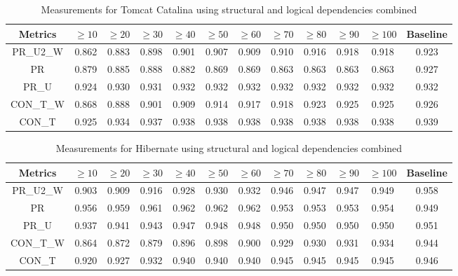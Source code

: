 \documentclass[runningheads]{comsis2}
\begin{document}
\begin{table}[!h]
\setlength\tabcolsep{3.5pt}
\caption{Measurements for Tomcat Catalina using structural and logical dependencies combined}
\label{tab:measurementscombined:tomcat}
\centering
\begin{tabular}{|c|cccccccccc|c|}
\hline
Metrics &	$\geq10$	&	$\geq20$		&	$\geq30$		&	$\geq40$		&	$\geq50$		&	$\geq60$		&	$\geq70$		&	$\geq80$		&	$\geq90$		&	$\geq100$		&	Baseline \\
\hline

PR\_U2\_W	&	0.862	&	0.883	&	0.898	&	0.901	&	0.907	&	0.909	&	0.910	&	0.916	&	0.918	&	0.918	&	0.923	\\
PR	&	0.879	&	0.885	&	0.888	&	0.882	&	0.869	&	0.869	&	0.863	&	0.863	&	0.863	&	0.863	&	0.927	\\
PR\_U	&	0.924	&	0.930	&	0.931	&	0.932	&	0.932	&	0.932	&	0.932	&	0.932	&	0.932	&	0.932	&	0.932	\\
CON\_T\_W	&	0.868	&	0.888	&	0.901	&	0.909	&	0.914	&	0.917	&	0.918	&	0.923	&	0.925	&	0.925	&	0.926	\\
CON\_T	&	0.925	&	0.934	&	0.937	&	0.938	&	0.938	&	0.938	&	0.938	&	0.938	&	0.938	&	0.938	&	0.939	\\
																										

\hline
\end{tabular}
\end{table}


\begin{table}[!h]
\setlength\tabcolsep{3.5pt}
\caption{Measurements for Hibernate using structural and logical dependencies combined}
\label{tab:measurementscombined:hibernate}
\centering
\begin{tabular}{|c|cccccccccc|c|}
\hline
Metrics &	$\geq10$	&	$\geq20$		&	$\geq30$		&	$\geq40$		&	$\geq50$		&	$\geq60$		&	$\geq70$		&	$\geq80$		&	$\geq90$		&	$\geq100$		&	Baseline \\
\hline

PR\_U2\_W	&	0.903	&	0.909	&	0.916	&	0.928	&	0.930	&	0.932	&	0.946	&	0.947	&	0.947	&	0.949	&	0.958	\\
PR	&	0.956	&	0.959	&	0.961	&	0.962	&	0.962	&	0.962	&	0.953	&	0.953	&	0.953	&	0.954	&	0.949	\\
PR\_U	&	0.937	&	0.941	&	0.943	&	0.947	&	0.948	&	0.948	&	0.950	&	0.950	&	0.950	&	0.950	&	0.951	\\
CON\_T\_W	&	0.864	&	0.872	&	0.879	&	0.896	&	0.898	&	0.900	&	0.929	&	0.930	&	0.931	&	0.934	&	0.944	\\
CON\_T	&	0.920	&	0.927	&	0.932	&	0.940	&	0.940	&	0.940	&	0.945	&	0.945	&	0.945	&	0.945	&	0.946	\\

\hline
\end{tabular}
\end{table}
\end{document}
